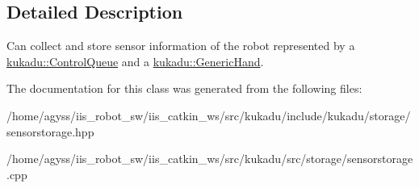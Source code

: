 \subsection{Detailed Description}
Can collect and store sensor information of the robot represented by a \hyperlink{classkukadu_1_1ControlQueue}{kukadu\+::\+Control\+Queue} and a \hyperlink{classkukadu_1_1GenericHand}{kukadu\+::\+Generic\+Hand}. 

The documentation for this class was generated from the following files\+:\begin{DoxyCompactItemize}
\item 
/home/agyss/iis\+\_\+robot\+\_\+sw/iis\+\_\+catkin\+\_\+ws/src/kukadu/include/kukadu/storage/sensorstorage.\+hpp\item 
/home/agyss/iis\+\_\+robot\+\_\+sw/iis\+\_\+catkin\+\_\+ws/src/kukadu/src/storage/sensorstorage.\+cpp\end{DoxyCompactItemize}
